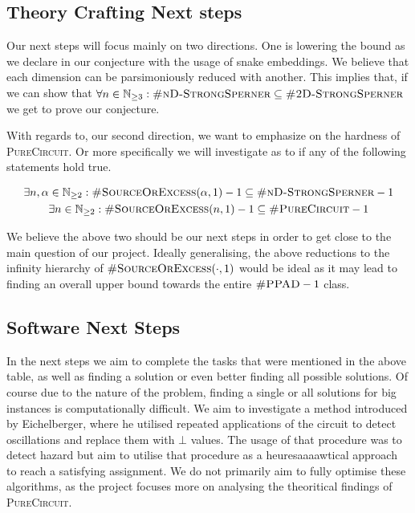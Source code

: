 

\subsection{Theory Crafting Next steps}

Our next steps will focus mainly on two directions. One is lowering the bound as we declare in our conjecture with the
usage of snake embeddings. We believe that each dimension can be parsimoniously reduced with another. This implies
that, if we can show that $\forall n \in \mathbb{N}_{\geq 3}: \textsc{\#nD-StrongSperner} \subseteq \textsc{\#2D-StrongSperner}$
we get to prove our conjecture.


With regards to, our second direction, we want to emphasize on the hardness of \textsc{PureCircuit}.
Or more specifically we will investigate as to if any of the following statements hold true.

\begin{gather*}
    \exists n, \alpha \in \mathbb{N}_{\geq 2}:
    \textsc{\#SourceOrExcess}(\alpha,1) - 1  \subseteq \textsc{\#nD-StrongSperner} -1 \\
    \exists n \in \mathbb{N}_{\geq 2}: \textsc{\#SourceOrExcess}(n,1) - 1 \subseteq \textsc{\#PureCircuit} -1 \\
\end{gather*}

We believe the above two should be our next steps in order to get close to the main question of our project.
Ideally generalising, the above reductions to the infinity hierarchy of
$\textsc{\#SourceOrExcess}(\cdot,1)$ would be ideal as it may lead to finding an overall upper bound
towards the entire $\textsc{\#PPAD} -1$ class.


\subsection{Software Next Steps}

In the next steps we aim to complete the tasks that were mentioned in the above table,
as well as finding a solution or even better finding all possible solutions. Of
course due to the nature of the problem, finding a single or all solutions for big instances
is computationally difficult. We aim to investigate a method introduced by Eichelberger, where
he utilised repeated applications of the circuit to detect oscillations and replace them with
$\bot$ values. The usage of that procedure was to detect hazard but aim to utilise that procedure
as a heuresaaaawtical approach to reach a satisfying assignment. We do not primarily aim
to fully optimise these algorithms, as the project focuses more on analysing the theoritical findings
of \textsc{PureCircuit}.




